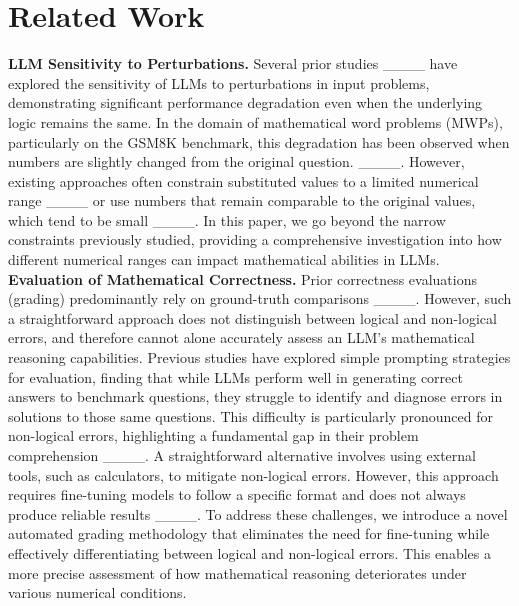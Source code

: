\section{Related Work}
\textbf{LLM Sensitivity to Perturbations.}
Several prior studies ____ have explored the sensitivity of LLMs to perturbations in input problems, demonstrating significant performance degradation even when the underlying logic remains the same. In the domain of mathematical word problems (MWPs), particularly on the GSM8K benchmark, this degradation has been observed when numbers are slightly changed from the original question. ____. However, existing approaches often constrain substituted values to a limited numerical range ____ or use numbers that remain comparable to the original values, which tend to be small ____. In this paper, we go beyond the narrow constraints previously studied, providing a comprehensive investigation into how different numerical ranges can impact mathematical abilities in LLMs.\\

\noindent \textbf{Evaluation of Mathematical Correctness.} Prior correctness evaluations (grading) predominantly rely on ground-truth comparisons
____. 
However, such a straightforward approach does not distinguish between logical and non-logical errors, and therefore cannot alone accurately assess an LLM's mathematical reasoning capabilities. 
Previous studies have explored simple prompting strategies for evaluation, finding that while LLMs perform well in generating correct answers to benchmark questions, they struggle to identify and diagnose errors in solutions to those same questions. This difficulty is particularly pronounced for non-logical errors, highlighting a fundamental gap in their problem comprehension ____. A straightforward alternative involves using external tools, such as calculators, to mitigate non-logical errors. However, this approach requires fine-tuning models to follow a specific format and does not always produce reliable results ____. To address these challenges, we introduce a novel automated grading methodology that eliminates the need for fine-tuning while effectively differentiating between logical and non-logical errors. This enables a more precise assessment of how mathematical reasoning deteriorates under various numerical conditions.


